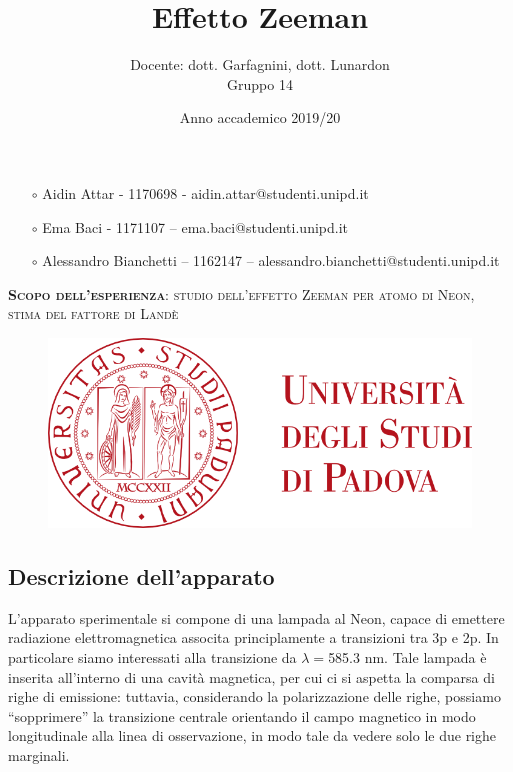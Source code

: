 \documentclass{article}
\title{Effetto Zeeman}
\author{Docente: dott. Garfagnini, dott. Lunardon \\
	Gruppo 14}
\date{Anno accademico 2019/20}
\begin{document}
	
	
	
	\maketitle
	
	\begin{itemize}
		\item[$\circ$] Aidin Attar - 1170698 - aidin.attar@studenti.unipd.it
		\item[$\circ$] Ema Baci - 1171107 – ema.baci@studenti.unipd.it
		\item[$\circ$] Alessandro Bianchetti – 1162147 – alessandro.bianchetti@studenti.unipd.it
	\end{itemize}
	
	\vspace{3 cm}
	\begin{large}\textsc{\textbf{Scopo dell'esperienza}: studio dell'effetto Zeeman per atomo di Neon, stima del fattore di Landè} 
	\end{large}
	\vspace{8.5cm}
	
	\begin{figure}[H]
		\centering
	\includegraphics[scale = 0.5 , angle=0]{unipd_logo.png}
	\end{figure}
	
	
	\twocolumn
	
	\subsection*{Descrizione dell'apparato} 
	
	L'apparato sperimentale si compone di una lampada al Neon, capace di emettere
	radiazione elettromagnetica associta principlamente a transizioni tra 3p e 2p.
	In particolare siamo interessati alla transizione da $\lambda = $585.3 nm.
	Tale lampada è inserita all'interno di una cavità magnetica, per cui ci si 
	aspetta la comparsa di righe di emissione: tuttavia, considerando la 
	polarizzazione delle righe, possiamo “sopprimere” la transizione centrale
	orientando il campo magnetico in modo longitudinale alla linea di 
	osservazione, in modo tale da vedere solo le due righe marginali. 
	
\end{document}
